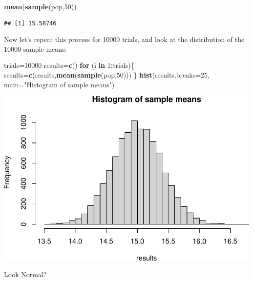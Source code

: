 \documentclass[
]{book}
\newenvironment{Shaded}{\begin{snugshade}}{\end{snugshade}}
\newcommand{\AttributeTok}[1]{\textcolor[rgb]{0.13,0.29,0.53}{#1}}
\newcommand{\ControlFlowTok}[1]{\textcolor[rgb]{0.13,0.29,0.53}{\textbf{#1}}}
\newcommand{\DecValTok}[1]{\textcolor[rgb]{0.00,0.00,0.81}{#1}}
\newcommand{\FunctionTok}[1]{\textcolor[rgb]{0.13,0.29,0.53}{\textbf{#1}}}
\newcommand{\NormalTok}[1]{#1}
\newcommand{\OtherTok}[1]{\textcolor[rgb]{0.56,0.35,0.01}{#1}}
\newcommand{\SpecialCharTok}[1]{\textcolor[rgb]{0.81,0.36,0.00}{\textbf{#1}}}
\newcommand{\StringTok}[1]{\textcolor[rgb]{0.31,0.60,0.02}{#1}}
\theoremstyle{definition}
\theoremstyle{definition}
\theoremstyle{definition}
\theoremstyle{definition}
\theoremstyle{remark}
\begin{document}
\begin{Shaded}
\begin{Highlighting}[]
\FunctionTok{mean}\NormalTok{(}\FunctionTok{sample}\NormalTok{(pop,}\DecValTok{50}\NormalTok{))}
\end{Highlighting}
\end{Shaded}

\begin{verbatim}
## [1] 15.58746
\end{verbatim}

Now let's repeat this process for 10000 trials, and look at the distribution of the 10000 sample means:

\begin{Shaded}
\begin{Highlighting}[]
\NormalTok{trials}\OtherTok{=}\DecValTok{10000}
\NormalTok{results}\OtherTok{=}\FunctionTok{c}\NormalTok{()}
\ControlFlowTok{for}\NormalTok{ (i }\ControlFlowTok{in} \DecValTok{1}\SpecialCharTok{:}\NormalTok{trials)\{}
\NormalTok{  results}\OtherTok{=}\FunctionTok{c}\NormalTok{(results,}\FunctionTok{mean}\NormalTok{(}\FunctionTok{sample}\NormalTok{(pop,}\DecValTok{50}\NormalTok{)))}
\NormalTok{\}}
\FunctionTok{hist}\NormalTok{(results,}\AttributeTok{breaks=}\DecValTok{25}\NormalTok{, }\AttributeTok{main=}\StringTok{"Histogram of sample means"}\NormalTok{)}
\end{Highlighting}
\end{Shaded}

\includegraphics{math340-notes_files/figure-latex/unnamed-chunk-199-1.pdf}

Look Normal?
\end{document}
